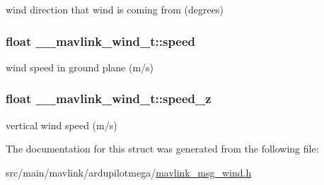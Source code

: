 wind direction that wind is coming from (degrees) 

\hypertarget{struct____mavlink__wind__t_a0223c35a47884f77ea93fe17398aefb1}{
\subsubsection[{speed}]{\setlength{\rightskip}{0pt plus 5cm}float \+\_\+\+\_\+mavlink\+\_\+wind\+\_\+t\+::speed}}\label{struct____mavlink__wind__t_a0223c35a47884f77ea93fe17398aefb1}


wind speed in ground plane (m/s) 

\hypertarget{struct____mavlink__wind__t_a3e784dbb8e040577732f2dbb97c14603}{
\subsubsection[{speed\+\_\+z}]{\setlength{\rightskip}{0pt plus 5cm}float \+\_\+\+\_\+mavlink\+\_\+wind\+\_\+t\+::speed\+\_\+z}}\label{struct____mavlink__wind__t_a3e784dbb8e040577732f2dbb97c14603}


vertical wind speed (m/s) 



The documentation for this struct was generated from the following file\+:\begin{DoxyCompactItemize}
\item 
src/main/mavlink/ardupilotmega/\hyperlink{mavlink__msg__wind_8h}{mavlink\+\_\+msg\+\_\+wind.\+h}\end{DoxyCompactItemize}
